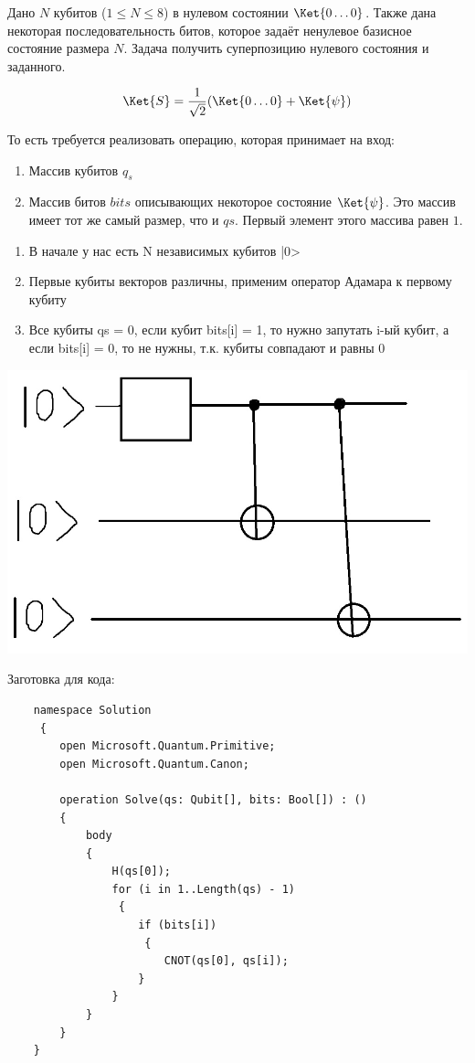 \documentclass{article}
\begin{document}
Дано $N$ кубитов ($1 \le N \le 8$) в нулевом состоянии $\Ket{0\dots0}$. Также дана некоторая последовательность битов, которое задаёт ненулевое базисное состояние размера $N$. Задача получить суперпозицию нулевого состояния и заданного.

$$\Ket{S} = \frac{1}{\sqrt2}(\Ket{0\dots0} +\Ket{\psi})$$

То есть требуется реализовать операцию, которая принимает на вход:

\begin{enumerate}
    \item Массив кубитов $q_s$
    \item Массив битов $bits$ описывающих некоторое состояние $\Ket{\psi}$. Это массив имеет тот же самый размер, что и $qs$. Первый элемент этого массива равен $1$.
\end{enumerate}

\begin{enumerate}
    \item В начале у нас есть N независимых кубитов |0>
    \item Первые кубиты векторов различны, применим оператор Адамара к первому кубиту
    \item Все кубиты qs = 0, если кубит bits[i] = 1, то нужно запутать i-ый кубит, а если bits[i] = 0, то не нужны, т.к. кубиты совпадают и равны 0
\end{enumerate}

\includegraphics[scale=0.5]{1.jpg}

Заготовка для кода:
\begin{lstlisting}
	namespace Solution
	 {
	    open Microsoft.Quantum.Primitive;
	    open Microsoft.Quantum.Canon;
	    
	    operation Solve(qs: Qubit[], bits: Bool[]) : () 
	    {
	        body 
	        { 
	            H(qs[0]);
	            for (i in 1..Length(qs) - 1)
	             {
	                if (bits[i])
	                 {
	                    CNOT(qs[0], qs[i]); 
	                } 
	            }                  
	        }
	    }
	}
\end{lstlisting}
\end{document}
